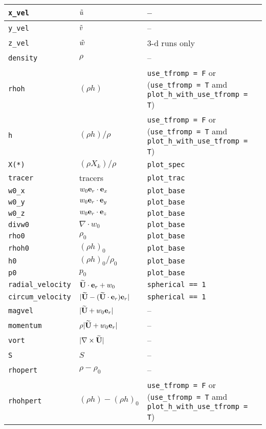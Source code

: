 \begin{center}
\begin{longtable}{|l|p{2.25in}|p{2.5in}|}
{\tt x\_vel}   & $\tilde{u}$  & -- \\
\hline
{\tt y\_vel}   & $\tilde{v}$  & -- \\
\hline
{\tt z\_vel}   & $\tilde{w}$  & 3-d runs only \\
\hline
{\tt density}  & $\rho$ & -- \\
\hline
{\tt rhoh}   & $(\rho h)$ & {\tt use\_tfromp = F} or ({\tt use\_tfromp = T} amd {\tt plot\_h\_with\_use\_tfromp = T}) \\           
\hline
{\tt h}      & $(\rho h)/\rho$   & {\tt use\_tfromp = F} or ({\tt use\_tfromp = T} amd {\tt plot\_h\_with\_use\_tfromp = T}) \\           
\hline
{\tt X(*)}   & $(\rho X_k)/\rho$ & {\tt plot\_spec} \\
\hline
{\tt tracer} & tracers           & {\tt plot\_trac} \\
\hline
{\tt w0\_x}  & $w_0 \mathbf{e}_r \cdot \mathbf{e}_x$ & {\tt plot\_base} \\ 
\hline
{\tt w0\_y}  & $w_0 \mathbf{e}_r \cdot \mathbf{e}_y$ & {\tt plot\_base} \\ 
\hline
{\tt w0\_z}  & $w_0 \mathbf{e}_r \cdot \mathbf{e}_z$ & {\tt plot\_base} \\ 
\hline
{\tt divw0}  & $\nabla \cdot w_0$  & {\tt plot\_base} \\ 
\hline
{\tt rho0}   & $\rho_0$            & {\tt plot\_base} \\ 
\hline
{\tt rhoh0}  & $(\rho h)_0$         & {\tt plot\_base} \\ 
\hline
{\tt h0}     & $(\rho h)_0/\rho_0$  & {\tt plot\_base} \\ 
\hline
{\tt p0}     & $p_0$                & {\tt plot\_base} \\ 
\hline
{\tt radial\_velocity}  & $\widetilde{{\bf U}} \cdot \mathbf{e}_r + w_0$ & {\tt spherical == 1} \\
\hline
{\tt circum\_velocity}  & $| \widetilde{{\bf U}} - (\widetilde{{\bf U}} \cdot \mathbf{e}_r) \mathbf{e}_r |$ &  {\tt spherical == 1}  \\
\hline
{\tt magvel}              & $| \widetilde{{\bf U}} + w_0 \mathbf{e}_r |$  & -- \\
\hline
{\tt momentum}            & $\rho | \widetilde{{\bf U}} + w_0 \mathbf{e}_r |$  & -- \\
\hline
{\tt vort}                & $| \nabla \times \widetilde{{\bf U}} |$   & -- \\
\hline
{\tt S}                   & $S$   & -- \\
\hline
{\tt rhopert}             & $\rho - \rho_0$  & -- \\
\hline
{\tt rhohpert}          & $(\rho h) - (\rho h)_0$ & {\tt use\_tfromp = F} or ({\tt use\_tfromp = T} amd {\tt plot\_h\_with\_use\_tfromp = T}) \\           

\end{longtable}
\end{center}
